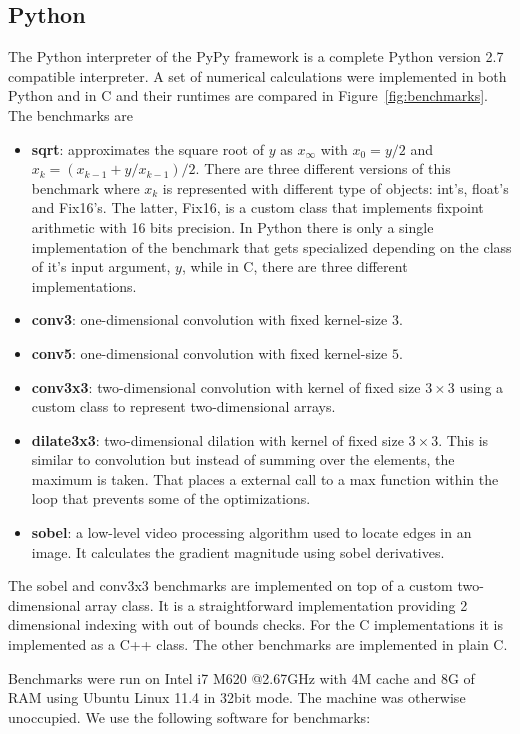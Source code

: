 \documentclass[preprint]{sigplanconf}
\begin{document}
\subsection{Python}
The Python interpreter of the PyPy framework is a complete Python
version 2.7 compatible interpreter. A set of numerical
calculations were implemented in both Python and in C and their
runtimes are compared in Figure~\ref{fig:benchmarks}. The benchmarks are
\begin{itemize}
\item {\bf sqrt}: approximates the square root of $y$ as $x_\infty$
  with $x_0=y/2$ and $x_k = \left( x_{k-1} + y/x_{k-1} \right) /
  2$. There are three different versions of this benchmark where $x_k$
  is represented with different type of objects: int's, float's and
  Fix16's. The latter, Fix16, is a custom class that implements
  fixpoint arithmetic with 16 bits precision. In Python there is only
  a single implementation of the benchmark that gets specialized
  depending on the class of it's input argument, $y$, while in C,
  there are three different implementations.
\item {\bf conv3}: one-dimensional convolution with fixed kernel-size $3$.
\item {\bf conv5}: one-dimensional convolution with fixed kernel-size $5$.
\item {\bf conv3x3}: two-dimensional convolution with kernel of fixed
  size $3 \times 3$ using a custom class to represent two-dimensional
  arrays.
\item {\bf dilate3x3}: two-dimensional dilation with kernel of fixed
  size $3 \times 3$. This is similar to convolution but instead of
  summing over the elements, the maximum is taken. That places a
  external call to a max function within the loop that prevents some
  of the optimizations.
\item {\bf sobel}: a low-level video processing algorithm used to
  locate edges in an image. It calculates the gradient magnitude
  using sobel derivatives. 
\end{itemize}

The sobel and conv3x3 benchmarks are implemented
on top of a custom two-dimensional array class.
It is
a straightforward implementation providing 2 dimensional
indexing with out of bounds checks. For the C implementations it is
implemented as a C++ class. The other benchmarks are implemented in
plain C. 

Benchmarks were run on Intel i7 M620 @2.67GHz with 4M cache and 8G of RAM
using Ubuntu Linux 11.4 in 32bit mode.
The machine was otherwise unoccupied. We use the following software
for benchmarks:
\end{document}
